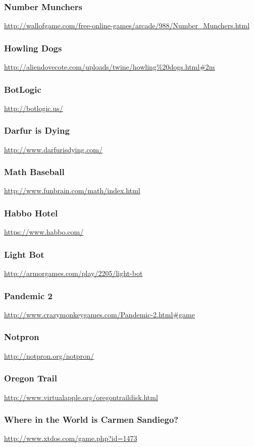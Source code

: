 \subsubsection{Number Munchers}\url{http://wallofgame.com/free-online-games/arcade/988/Number_Munchers.html}\subsubsection{Howling Dogs}\url{http://aliendovecote.com/uploads/twine/howling%20dogs.html#2m}\subsubsection{BotLogic}\url{http://botlogic.us/}\subsubsection{Darfur is Dying}\url{http://www.darfurisdying.com/}\subsubsection{Math Baseball}\url{http://www.funbrain.com/math/index.html}\subsubsection{Habbo Hotel}\url{https://www.habbo.com/}\subsubsection{Light Bot}\url{http://armorgames.com/play/2205/light-bot}\subsubsection{Pandemic 2}\url{http://www.crazymonkeygames.com/Pandemic-2.html#game}\subsubsection{Notpron}\url{http://notpron.org/notpron/}\subsubsection{Oregon Trail}\url{http://www.virtualapple.org/oregontraildisk.html}\subsubsection{Where in the World is Carmen Sandiego?}\url{http://www.xtdos.com/game.php?id=1473}